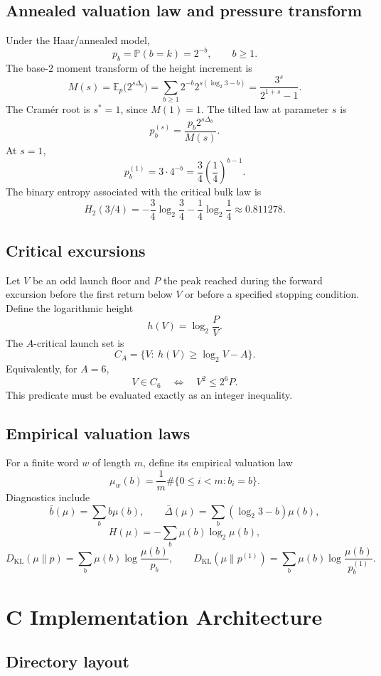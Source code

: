 \documentclass[11pt]{article}
\newcommand{\E}{\mathbb E}
\newcommand{\Prob}{\mathbb P}
\newcommand{\KL}{D_{\mathrm{KL}}}
\newcommand{\Htwo}{H_2}
\begin{document}
\subsection{Annealed valuation law and pressure transform}

Under the Haar/annealed model,
\[
  p_b=\Prob(b=k)=2^{-b},\qquad b\ge1.
\]
The base-$2$ moment transform of the height increment is
\[
  M(s)=\E_p\bigl(2^{s\Delta_b}\bigr)
  =\sum_{b\ge1}2^{-b}2^{s(\log_2 3-b)}
  =\frac{3^s}{2^{1+s}-1}.
\]
The Cram\'er root is $s^*=1$, since $M(1)=1$. The tilted law at parameter $s$ is
\[
  p_b^{(s)}=\frac{p_b2^{s\Delta_b}}{M(s)}.
\]
At $s=1$,
\[
  p_b^{(1)}=3\cdot4^{-b}=\frac34\left(\frac14\right)^{b-1}.
\]
The binary entropy associated with the critical bulk law is
\[
  \Htwo(3/4)=-\frac34\log_2\frac34-\frac14\log_2\frac14\approx0.811278.
\]

\subsection{Critical excursions}

Let $V$ be an odd launch floor and $P$ the peak reached during the forward excursion before the first return below $V$ or before a specified stopping condition. Define the logarithmic height
\[
  h(V)=\log_2\frac{P}{V}.
\]
The $A$-critical launch set is
\[
  C_A=\{V:\ h(V)\ge \log_2 V-A\}.
\]
Equivalently, for $A=6$,
\[
  V\in C_6\quad\Longleftrightarrow\quad V^2\le 2^6P.
\]
This predicate must be evaluated exactly as an integer inequality.

\subsection{Empirical valuation laws}

For a finite word $w$ of length $m$, define its empirical valuation law
\[
  \mu_w(b)=\frac{1}{m}\#\{0\le i<m:b_i=b\}.
\]
Diagnostics include
\[
  \bar b(\mu)=\sum_b b\mu(b),\qquad
  \bar\Delta(\mu)=\sum_b(\log_2 3-b)\mu(b),
\]
\[
  H(\mu)=-\sum_b\mu(b)\log_2\mu(b),
\]
\[
  \KL(\mu\|p)=\sum_b\mu(b)\log\frac{\mu(b)}{p_b},
  \qquad
  \KL(\mu\|p^{(1)})=\sum_b\mu(b)\log\frac{\mu(b)}{p_b^{(1)}}.
\]

\section{C Implementation Architecture}

\subsection{Directory layout}
\end{document}
